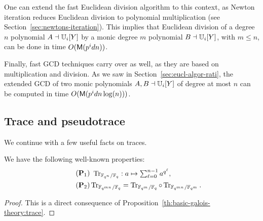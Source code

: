 One can extend the fast Euclidean division algorithm to this context,
as Newton iteration reduces Euclidean division to polynomial
multiplication (see Section~\ref{sec:newtons-iteration}). This implies
that Euclidean division of a degree $n$ polynomial $A \dashv \mathbb{U}_i[Y]$ by
a monic degree $m$ polynomial $B \dashv \mathbb{U}_i[Y]$, with $m \le n$, can be
done in time $O(\mathsf{M}(p^id n))$.

Finally, fast GCD techniques carry over as well, as they are based on
multiplication and division. As we saw in
Section~\ref{sec:eucl-algor-rati}, the extended GCD of two monic
polynomials $A,B \dashv \mathbb{U}_i[Y]$ of degree at most $n$ can be computed
in time $O(\mathsf{M}(p^id n \log(n)))$.


\subsection{Trace and pseudotrace}\label{ssec:tpt}


We continue with a few useful facts on traces.

\begin{proposition}
  We have the following well-known properties:
  \begin{align}
  \tag{$\mathbf{P}_1$}\label{eq:78} &\begin{array}{c}  
  \Tr_{\F_{q^n}/\F_q}: a \mapsto \sum_{\ell=0}^{n -
    1}a^{q^\ell} \text{,}
  \end{array}\\
  \tag{$\mathbf{P}_2$}\label{eq:trcomp}
  &\Tr_{\F_{q^{mn}}/\F_q} = \Tr_{\F_{q^m}/\F_q} \circ
  \Tr_{\F_{q^{mn}}/\F_{q^m}}\text{.}
\end{align}
\end{proposition}
\begin{proof}
  This is a direct consequence of
  Proposition~\ref{th:basic-galois-theory:trace}.
\end{proof}

